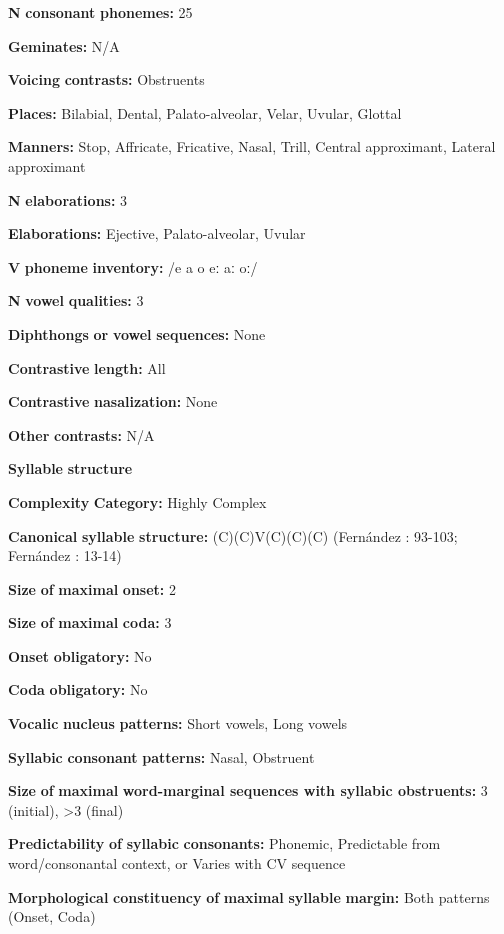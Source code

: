 \begin{styleBody}
\textbf{N} \textbf{consonant} \textbf{phonemes:} 25

\textbf{Geminates:} N/A

\textbf{Voicing} \textbf{contrasts:} Obstruents

\textbf{Places:} Bilabial, Dental, Palato-alveolar, Velar, Uvular, Glottal

\textbf{Manners:} Stop, Affricate, Fricative, Nasal, Trill, Central approximant, Lateral approximant

\textbf{N} \textbf{elaborations:} 3

\textbf{Elaborations:} Ejective, Palato-alveolar, Uvular

\textbf{V} \textbf{phoneme} \textbf{inventory:} /e a o eː aː oː/

\textbf{N} \textbf{vowel} \textbf{qualities:} 3

\textbf{Diphthongs} \textbf{or} \textbf{vowel} \textbf{sequences:} None

\textbf{Contrastive} \textbf{length:} All

\textbf{Contrastive} \textbf{nasalization:} None

\textbf{Other} \textbf{contrasts:} N/A

\textbf{Syllable} \textbf{structure}

\textbf{Complexity} \textbf{Category:} Highly Complex

\textbf{Canonical} \textbf{syllable} \textbf{structure:} (C)(C)V(C)(C)(C) (Fernández \citealt{Garay1998}: 93-103; Fernández \citealt{GarayHernández2006}: 13-14)

\textbf{Size} \textbf{of} \textbf{maximal} \textbf{onset:} 2

\textbf{Size} \textbf{of} \textbf{maximal} \textbf{coda:} 3

\textbf{Onset} \textbf{obligatory:} No

\textbf{Coda} \textbf{obligatory:} No

\textbf{Vocalic} \textbf{nucleus} \textbf{patterns:} Short vowels, Long vowels

\textbf{Syllabic} \textbf{consonant} \textbf{patterns:} Nasal, Obstruent

\textbf{Size} \textbf{of} \textbf{maximal} \textbf{word{}-marginal sequences with syllabic obstruents:} 3 (initial), >3 (final)

\textbf{Predictability} \textbf{of} \textbf{syllabic} \textbf{consonants:} Phonemic, Predictable from word/consonantal context, or Varies with CV sequence

\textbf{Morphological} \textbf{constituency} \textbf{of} \textbf{maximal} \textbf{syllable} \textbf{margin:} Both patterns (Onset, Coda)


\end{styleBody}
